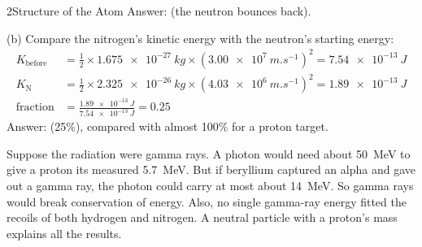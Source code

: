 \begin{chapteranswers}{2}{Structure of the Atom}
        Answer:  (the
        neutron bounces back).\par
        (b) Compare the nitrogen's kinetic energy with the neutron's starting energy:
        \begin{align*}
          K_\mathrm{before} &= \tfrac12\times\qty{1.675e-27}{kg}\times(\qty{3.00e7}{m.s^{-1}})^2 = \qty{7.54e-13}{J}\\
          K_\mathrm{N} &= \tfrac12\times\qty{2.325e-26}{kg}\times(\qty{4.03e6}{m.s^{-1}})^2 = \qty{1.89e-13}{J}\\
          \text{fraction} &= \frac{\qty{1.89e-13}{J}}{\qty{7.54e-13}{J}} = 0.25
        \end{align*}
        Answer:  (25\%), compared with almost 100\% for a proton target.
  \item Suppose the radiation were gamma rays. A photon would need about
        \qty{50}{MeV} to give a proton its measured \qty{5.7}{MeV}. But if
        beryllium captured an alpha and gave out a gamma ray, the photon could
        carry at most about \qty{14}{MeV}. So gamma rays would break conservation
        of energy. Also, no single gamma-ray energy fitted the recoils of both
        hydrogen and nitrogen. A neutral particle with a proton's mass explains
        all the results.
\end{chapteranswers}

